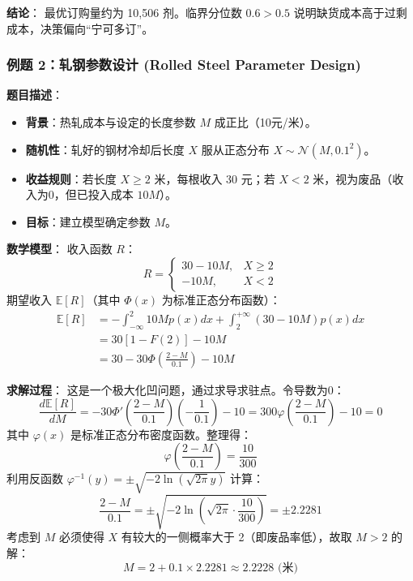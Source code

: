 \documentclass[a4paper,12pt]{ctexart} %
\begin{document}
	\textbf{结论}：
	最优订购量约为 10,506 剂。临界分位数 $0.6 > 0.5$ 说明缺货成本高于过剩成本，决策偏向“宁可多订”。

	
	\subsubsection{例题 2：轧钢参数设计 (Rolled Steel Parameter Design)}
	
	\textbf{题目描述}：
	\begin{itemize}
		\item \textbf{背景}：热轧成本与设定的长度参数 $M$ 成正比（10元/米）。
		\item \textbf{随机性}：轧好的钢材冷却后长度 $X$ 服从正态分布 $X \sim \mathcal{N}(M, 0.1^2)$。
		\item \textbf{收益规则}：若长度 $X \ge 2$ 米，每根收入 30 元；若 $X < 2$ 米，视为废品（收入为0，但已投入成本 $10M$）。
		\item \textbf{目标}：建立模型确定参数 $M$。
	\end{itemize}
	
	\textbf{数学模型}：
	收入函数 $R$：
	\begin{equation}
		R=\begin{cases}
			30-10M, & X \ge 2\\
			-10M, & X < 2
		\end{cases}
	\end{equation}
	期望收入 $\mathbb{E}[R]$（其中 $\Phi(x)$ 为标准正态分布函数）：
	\begin{align*}
		\mathbb{E}[R] &= -\int_{-\infty}^{2}10M p(x)dx + \int_{2}^{+\infty}(30-10M)p(x)dx \\
		&= 30[1-F(2)] - 10M \\
		&= 30 - 30\Phi\left(\frac{2-M}{0.1}\right) - 10M
	\end{align*}
	
	\textbf{求解过程}：
	这是一个极大化凹问题，通过求导求驻点。令导数为0：
	\[
	\frac{d\mathbb{E}[R]}{dM} = -30\Phi'\left(\frac{2-M}{0.1}\right)\left(-\frac{1}{0.1}\right) - 10 = 300\varphi\left(\frac{2-M}{0.1}\right) - 10 = 0
	\]
	其中 $\varphi(x)$ 是标准正态分布密度函数。整理得：
	\[
	\varphi\left(\frac{2-M}{0.1}\right) = \frac{10}{300}
	\]
	利用反函数 $\varphi^{-1}(y) = \pm\sqrt{-2\ln(\sqrt{2\pi}y)}$ 计算：
	\[
	\frac{2-M}{0.1} = \pm\sqrt{-2\ln\left(\sqrt{2\pi}\cdot\frac{10}{300}\right)} = \pm 2.2281
	\]
	考虑到 $M$ 必须使得 $X$ 有较大的一侧概率大于 2（即废品率低），故取 $M > 2$ 的解：
	\[
	M = 2 + 0.1 \times 2.2281 \approx 2.2228 \text{ (米)}
	\]
	
\end{document}
